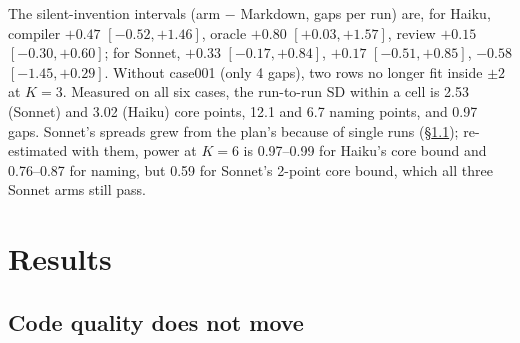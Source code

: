 \documentclass{article}
\begin{document}
The silent-invention intervals (arm $-$ Markdown, gaps per run) are, for Haiku, compiler $+0.47$
$[-0.52, +1.46]$, oracle $+0.80$ $[+0.03, +1.57]$, review $+0.15$ $[-0.30, +0.60]$; for Sonnet, $+0.33$
$[-0.17, +0.84]$, $+0.17$ $[-0.51, +0.85]$, $-0.58$ $[-1.45, +0.29]$. Without case001 (only 4 gaps), two rows no
longer fit inside $\pm 2$ at $K = 3$. Measured on all six cases, the run-to-run SD within a cell is 2.53
(Sonnet) and 3.02 (Haiku) core points, 12.1 and 6.7 naming points, and 0.97 gaps. Sonnet's spreads grew from
the plan's because of single runs (\S\ref{sec:core}); re-estimated with them, power at $K = 6$ is 0.97--0.99
for Haiku's core bound and 0.76--0.87 for naming, but 0.59 for Sonnet's 2-point core bound, which all three
Sonnet arms still pass.

\section{Results}

\subsection{Code quality does not move}\label{sec:core}
\end{document}
